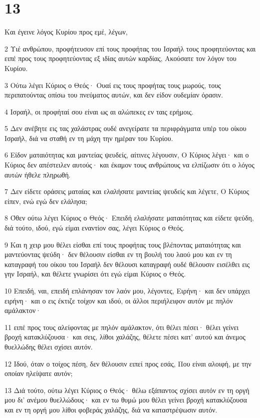 \chapter{13}

\par Και έγεινε λόγος Κυρίου προς εμέ, λέγων,
\par 2 Υιέ ανθρώπου, προφήτευσον επί τους προφήτας του Ισραήλ τους προφητεύοντας και ειπέ προς τους προφητεύοντας εξ ιδίας αυτών καρδίας, Ακούσατε τον λόγον του Κυρίου.
\par 3 Ούτω λέγει Κύριος ο Θεός· Ουαί εις τους προφήτας τους μωρούς, τους περιπατούντας οπίσω του πνεύματος αυτών, και δεν είδον ουδεμίαν όρασιν.
\par 4 Ισραήλ, οι προφήταί σου είναι ως αι αλώπεκες εν ταις ερήμοις.
\par 5 Δεν ανέβητε εις τας χαλάστρας ουδέ ανεγείρατε τα περιφράγματα υπέρ του οίκου Ισραήλ, διά να σταθή εν τη μάχη την ημέραν του Κυρίου.
\par 6 Είδον ματαιότητας και μαντείας ψευδείς, αίτινες λέγουσιν, Ο Κύριος λέγει· και ο Κύριος δεν απέστειλεν αυτούς· και έκαμον τους ανθρώπους να ελπίζωσιν ότι ο λόγος αυτών ήθελε πληρωθή.
\par 7 Δεν είδετε οράσεις ματαίας και ελαλήσατε μαντείας ψευδείς και λέγετε, Ο Κύριος είπεν, ενώ εγώ δεν ελάλησα;
\par 8 Όθεν ούτω λέγει Κύριος ο Θεός· Επειδή ελαλήσατε ματαιότητας και είδετε ψεύδη, διά τούτο, ιδού, εγώ είμαι εναντίον σας, λέγει Κύριος ο Θεός.
\par 9 Και η χειρ μου θέλει είσθαι επί τους προφήτας τους βλέποντας ματαιότητας και μαντεύοντας ψεύδη· δεν θέλουσιν είσθαι εν τη βουλή του λαού μου και εν τη καταγραφή του οίκου του Ισραήλ δεν θέλουσι καταγραφή ουδέ θέλουσιν εισέλθει εις γην Ισραήλ, και θέλετε γνωρίσει ότι εγώ είμαι Κύριος ο Θεός.
\par 10 Επειδή, ναι, επειδή επλάνησαν τον λαόν μου, λέγοντες, Ειρήνη· και δεν υπάρχει ειρήνη· και ο εις έκτιζε τοίχον και ιδού, οι άλλοι περιήλειφον αυτόν με πηλόν αμάλακτον·
\par 11 ειπέ προς τους αλείφοντας με πηλόν αμάλακτον, ότι θέλει πέσει· θέλει γείνει βροχή κατακλύζουσα· και σεις, λίθοι χαλάζης, θέλετε πέσει κατ' αυτού και άνεμος θυελλώδης θέλει σχίσει αυτόν.
\par 12 Ιδού, όταν ο τοίχος πέση, δεν θέλουσιν ειπεί προς εσάς, Που είναι αλοιφή, με την οποίαν ηλείψατε αυτόν;
\par 13 Διά τούτο, ούτω λέγει Κύριος ο Θεός· θέλω εξάπαντος σχίσει αυτόν εν τη οργή μου δι' ανέμου θυελλώδους· και εν τω θυμώ μου θέλει γείνει βροχή κατακλύζουσα και εν τη οργή μου λίθοι φοβεράς χαλάζης, διά να καταστρέψωσιν αυτόν.
